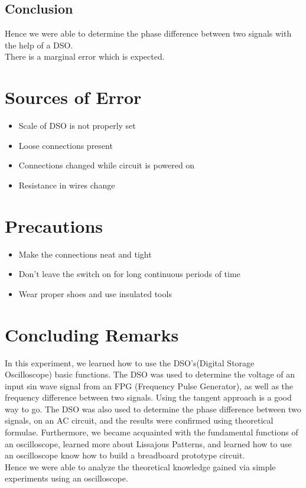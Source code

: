 \documentclass{article}
\begin{document}
\subsection{Conclusion}
Hence we were able to determine the phase difference between two signals with
the help of a DSO. \\
There is a marginal error which is expected.
\newpage
\section{Sources of Error}
\begin{itemize}
    \item Scale of DSO is not properly set
    \item Loose connections present
    \item Connections changed while circuit is powered on
    \item Resistance in wires change
\end{itemize}

\vspace{15px}

\section{Precautions}

\begin{itemize}
    \item Make the connections neat and tight
    \item Don’t leave the switch on for long continuous periods of time
    \item Wear proper shoes and use insulated tools
\end{itemize}

\vspace{15px}

\section{Concluding Remarks}
In this experiment, we learned how to use the DSO's(Digital Storage Oscilloscope) basic functions. The DSO was used to determine the voltage of an input sin wave signal from an FPG (Frequency Pulse Generator), as well as the frequency difference between two signals. Using the tangent approach is a good way to go. The DSO was also used to determine the phase difference between two signals, on an AC circuit, and the results were confirmed using theoretical formulae. Furthermore, we became acquainted with the fundamental functions of an oscilloscope, learned more about Lissajous Patterns, and learned how to use an oscilloscope know how to build a breadboard prototype circuit. \\ 
Hence we were able to analyze the theoretical knowledge gained via simple experiments using an oscilloscope.
\end{document}
